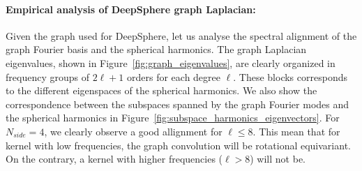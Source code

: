 \documentclass{article} %
\newtheorem{theorem}{Theorem}
\newcommand{\figref}[1]{Figure~\ref{fig:#1}}
\renewcommand{\b}[1]{{\bm{#1}}}   %
\newcommand{\1}{\b{1}}              %
\newcommand{\0}{\b{0}}              %
\renewcommand{\L}{\b{L}}
\newcommand{\U}{\b{U}}
\begin{document}



\paragraph{Empirical analysis of DeepSphere graph Laplacian:} 
Given the graph used for DeepSphere, let us analyse the spectral alignment of the graph Fourier basis and the spherical harmonics.
The graph Laplacian eigenvalues, shown in \figref{graph_eigenvalues}, are clearly organized in frequency groups of $2\ell + 1$ orders for each degree $\ell$.
These blocks corresponds to the different eigenspaces of the spherical harmonics.
We also show the correspondence between the subspaces spanned by the graph Fourier modes and the spherical harmonics in \figref{subspace_harmonics_eigenvectors}.
For $N_{side}=4$, we clearly observe a good allignment for $\ell\leq 8$. This mean that for kernel with low frequencies, the graph convolution will be rotational equivariant. On the contrary, a kernel with higher frequencies ($\ell>8$) will not be.
\end{document}
